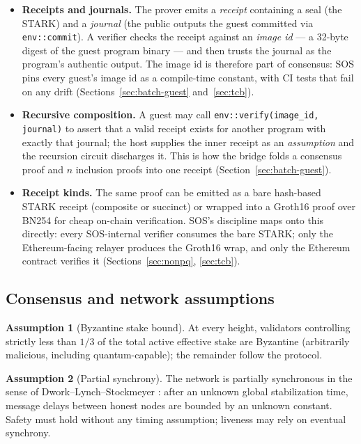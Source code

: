\documentclass[11pt]{article}
\newcommand{\code}[1]{\texttt{#1}}
\theoremstyle{plain}
\theoremstyle{definition}
\newtheorem{assumption}{Assumption}
\theoremstyle{remark}
\begin{document}
\begin{itemize}[leftmargin=1.6em]
\item \textbf{Receipts and journals.} The prover emits a \emph{receipt}
  containing a seal (the STARK) and a \emph{journal} (the public outputs the
  guest committed via \code{env::commit}). A verifier checks the receipt
  against an \emph{image id} --- a 32-byte digest of the guest program binary
  --- and then trusts the journal as the program's authentic output. The image
  id is therefore part of consensus: SOS pins every guest's image id as a
  compile-time constant, with CI tests that fail on any drift
  (Sections~\ref{sec:batch-guest} and~\ref{sec:tcb}).
\item \textbf{Recursive composition.} A guest may call
  \code{env::verify(image\_id, journal)} to assert that a valid receipt exists
  for another program with exactly that journal; the host supplies the inner
  receipt as an \emph{assumption} and the recursion circuit discharges it.
  This is how the bridge folds a consensus proof and $n$ inclusion proofs into
  one receipt (Section~\ref{sec:batch-guest}).
\item \textbf{Receipt kinds.} The same proof can be emitted as a bare
  hash-based STARK receipt (composite or succinct) or wrapped into a Groth16
  proof over BN254 for cheap on-chain verification. SOS's discipline maps onto
  this directly: every SOS-internal verifier consumes the bare STARK; only
  the Ethereum-facing relayer produces the Groth16 wrap, and only the
  Ethereum contract verifies it (Sections~\ref{sec:nonpq}, \ref{sec:tcb}).
\end{itemize}

\subsection{Consensus and network assumptions}

\begin{assumption}[Byzantine stake bound]
\label{ass:byz}
At every height, validators controlling strictly less than $1/3$ of the total
active effective stake are Byzantine (arbitrarily malicious, including
quantum-capable); the remainder follow the protocol.
\end{assumption}

\begin{assumption}[Partial synchrony]
\label{ass:synchrony}
The network is partially synchronous in the sense of Dwork--Lynch--Stockmeyer
\cite{dls1988}: after an unknown global stabilization time, message delays
between honest nodes are bounded by an unknown constant. Safety must hold
without any timing assumption; liveness may rely on eventual synchrony.
\end{assumption}
\end{document}
